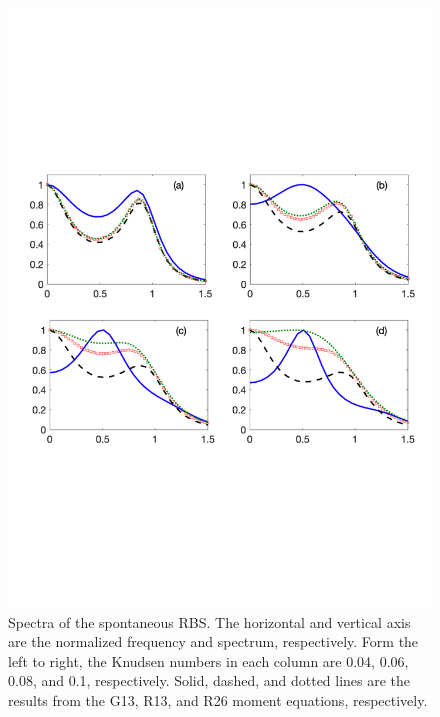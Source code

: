 

\begin{figure}[t]
	\centering
	\includegraphics[scale=0.6]{FluidDynamic/IMG/Moment.pdf}
	\caption{Spectra of the spontaneous RBS. The horizontal and vertical axis are the normalized frequency and spectrum, respectively. Form the left to right, the Knudsen numbers in each column are 0.04, 0.06, 0.08, and 0.1, respectively. Solid, dashed, and dotted lines are the results from the G13, R13, and R26 moment equations, respectively.  }
	\label{fig:moment}
\end{figure}



